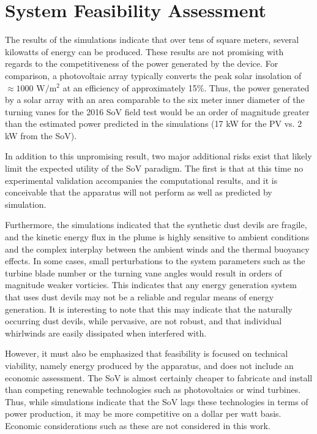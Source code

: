 %
%
\section{System Feasibility Assessment}

The results of the simulations indicate that over tens of square meters,
several kilowatts of energy can be produced. These results are not
promising with regards to the competitiveness of the power generated by
the device. For comparison, a photovoltaic array typically converts 
the peak solar insolation of $\approx 1000 \text{ W}/\text{m}^2$ at an efficiency 
of approximately 15\%. Thus, the power generated by a solar array with 
an area comparable to the six meter inner diameter of the turning 
vanes for the 2016 SoV field test would be an order of magnitude greater than 
the estimated power predicted in the simulations 
(17 kW for the PV vs. 2 kW from the SoV). 

In addition to this unpromising result, two major additional risks 
exist that likely limit the expected utility of the SoV paradigm. 
The first is that at this time no experimental validation accompanies the
computational results, and it is conceivable that the apparatus will not
perform as well as predicted by simulation.  

Furthermore, the simulations indicated that the synthetic dust devils 
are fragile, and
the kinetic energy flux in the plume is highly sensitive to ambient
conditions and the complex interplay between the ambient winds and the
thermal buoyancy effects. In some cases, small perturbations to the
system parameters such as the turbine blade number or the turning vane
angles would result in orders of magnitude weaker vorticies. 
This indicates that any energy generation system that uses dust
devils may not be a reliable and regular means of energy generation. 
It is interesting to note that this may indicate that the 
naturally occurring dust devils, 
while pervasive, are not robust, and that individual whirlwinds are 
easily dissipated when interfered with. 

However, it must also be emphasized that feasibility is focused on
technical viability, namely energy produced by the apparatus, and does
not include an economic assessment. The SoV is almost certainly cheaper
to fabricate and install than competing renewable technologies such as
photovoltaics or wind turbines. Thus, while simulations indicate that
the SoV lags these technologies in terms of power production, it may be
more competitive on a dollar per watt basis. Economic considerations 
such as these are not considered in this work. 

